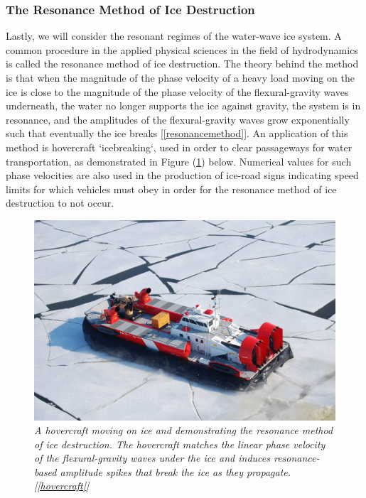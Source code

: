 \documentclass{article}
\begin{document}
\subsubsection{The Resonance Method of Ice Destruction}

Lastly, we will consider the resonant regimes of the water-wave ice system. A common procedure in the applied physical sciences in the field of hydrodynamics is called the resonance method of ice destruction. The theory behind the method is that when the magnitude of the phase velocity of a heavy load moving on the ice is close to the magnitude of the phase velocity of the flexural-gravity waves underneath, the water no longer supports the ice against gravity, the system is in resonance, and the amplitudes of the flexural-gravity waves grow exponentially such that eventually the ice breaks [\ref{resonancemethod}]. An application of this method is hovercraft `icebreaking`, used in order to clear passageways for water transportation, as demonstrated in Figure (\ref{Hovercraft}) below. Numerical values for such phase velocities are also used in the production of ice-road signs indicating speed limits for which vehicles must obey in order for the resonance method of ice destruction to not occur.
\\

\begin{figure}[hbt!]
\centering
\includegraphics[scale = .4]{Hovercraft.jpg}
\caption{\emph{A hovercraft moving on ice and demonstrating the resonance method of ice destruction. The hovercraft matches the linear phase velocity of the flexural-gravity waves under the ice and induces resonance-based amplitude spikes that break the ice as they propagate. [\ref{hovercraft}]}}\label{Hovercraft}
\end{figure}
\end{document}
